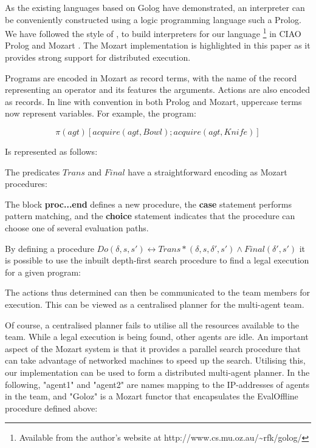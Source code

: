 \documentclass{llncs}
\begin{document}
\label{sec:Language-Execution}

As the existing languages based on Golog have demonstrated, an interpreter
can be conveniently constructed using a logic programming language
such a Prolog. We have followed the style of \cite{giacomo00congolog,giacomo99indigolog},
to build interpreters for our language%
\footnote{Available from the author's website at http://www.cs.mu.oz.au/\textasciitilde{}rfk/golog/%
} in CIAO Prolog \cite{iclp99ciao} and Mozart \cite{vanroy03mozart_logic}.
The Mozart implementation is highlighted in this paper as it provides
strong support for distributed execution.

Programs are encoded in Mozart as record terms, with the name of the
record representing an operator and its features the arguments. Actions
are also encoded as records. In line with convention in both Prolog
and Mozart, uppercase terms now represent variables. For example,
the program:

\[
\pi(agt)\left[acquire(agt,Bowl);acquire(agt,Knife)\right]\]


Is represented as follows:



The predicates $Trans$ and $Final$ have a straightforward encoding
as Mozart procedures:





The block \textbf{proc...end} defines a new procedure, the \textbf{case}
statement performs pattern matching, and the \textbf{choice} statement
indicates that the procedure can choose one of several evaluation
paths.

By defining a procedure $Do(\delta,s,s')\leftrightarrow Trans*(\delta,s,\delta',s')\wedge Final(\delta',s')$
it is possible to use the inbuilt depth-first search procedure to
find a legal execution for a given program:



The actions thus determined can then be communicated to the team members
for execution. This can be viewed as a centralised planner for the
multi-agent team.

Of course, a centralised planner fails to utilise all the resources
available to the team. While a legal execution is being found, other
agents are idle. An important aspect of the Mozart system is that
it provides a parallel search procedure that can take advantage of
networked machines to speed up the search. Utilising this, our implementation
can be used to form a distributed multi-agent planner. In the following,
"agent1" and "agent2" are names mapping to the IP-addresses
of agents in the team, and "Goloz" is a Mozart functor that
encapsulates the EvalOffline procedure defined above:
\end{document}
